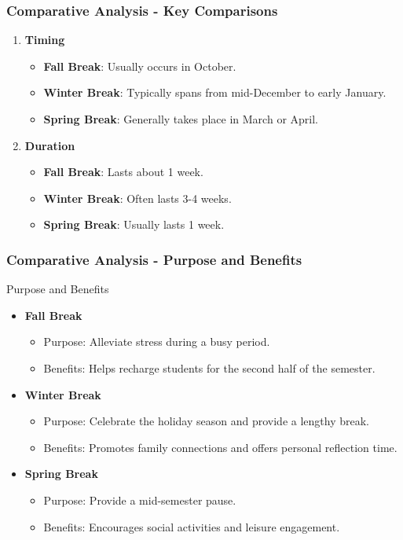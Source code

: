\documentclass[aspectratio=169]{beamer}
\begin{document}
\begin{frame}[fragile]
    \frametitle{Comparative Analysis - Key Comparisons}
    \begin{enumerate}
        \item \textbf{Timing}
            \begin{itemize}
                \item \textbf{Fall Break}: Usually occurs in October.
                \item \textbf{Winter Break}: Typically spans from mid-December to early January.
                \item \textbf{Spring Break}: Generally takes place in March or April.
            \end{itemize}

        \item \textbf{Duration}
            \begin{itemize}
                \item \textbf{Fall Break}: Lasts about 1 week.
                \item \textbf{Winter Break}: Often lasts 3-4 weeks.
                \item \textbf{Spring Break}: Usually lasts 1 week.
            \end{itemize}
    \end{enumerate}
\end{frame}

\begin{frame}[fragile]
    \frametitle{Comparative Analysis - Purpose and Benefits}
    \begin{block}{Purpose and Benefits}
        \begin{itemize}
            \item \textbf{Fall Break}
                \begin{itemize}
                    \item Purpose: Alleviate stress during a busy period.
                    \item Benefits: Helps recharge students for the second half of the semester.
                \end{itemize}
            \item \textbf{Winter Break}
                \begin{itemize}
                    \item Purpose: Celebrate the holiday season and provide a lengthy break.
                    \item Benefits: Promotes family connections and offers personal reflection time.
                \end{itemize}
            \item \textbf{Spring Break}
                \begin{itemize}
                    \item Purpose: Provide a mid-semester pause.
                    \item Benefits: Encourages social activities and leisure engagement.
                \end{itemize}
        \end{itemize}
    \end{block}
\end{frame}
\end{document}

